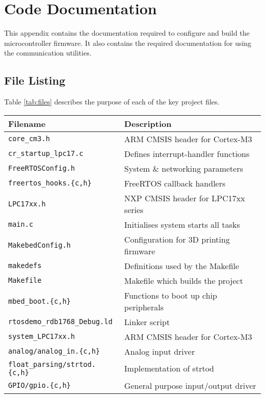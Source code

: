 \chapter{Code Documentation}
	
	This appendix contains the documentation required to configure and build the
	microcontroller firmware. It also contains the required documentation for
	using the communication utilities.
	
	\section{File Listing}
		
		Table \ref{tab:files} describes the purpose of each of the key project
		files.
		
		\begin{table}
			\begin{tabular}{p{0.45\textwidth} p{}}
				\toprule
				Filename & Description \\
				\midrule
				\verb|core_cm3.h| & ARM CMSIS header for Cortex-M3 \\
				\verb|cr_startup_lpc17.c| & Defines interrupt-handler functions \\
				\verb|FreeRTOSConfig.h| & System \& networking parameters \\
				\verb|freertos_hooks.{c,h}| & FreeRTOS callback handlers \\
				\verb|LPC17xx.h| & NXP CMSIS header for LPC17xx series \\
				\verb|main.c| & Initialises system starts all tasks \\
				\verb|MakebedConfig.h| & Configuration for 3D printing firmware \\
				\verb|makedefs| & Definitions used by the Makefile \\
				\verb|Makefile| & Makefile which builds the project \\
				\verb|mbed_boot.{c,h}| & Functions to boot up chip peripherals \\
				\verb|rtosdemo_rdb1768_Debug.ld| & Linker script \\
				\verb|system_LPC17xx.h| & ARM CMSIS header for Cortex-M3 \\
				\addlinespace
				\verb|analog/analog_in.{c,h}| & Analog input driver \\
				\addlinespace
				\verb|float_parsing/strtod.{c,h}| & Implementation of strtod \\
				\addlinespace
				\verb|GPIO/gpio.{c,h}| & General purpose input/output driver \\

\end{tabular}
\end{table}
